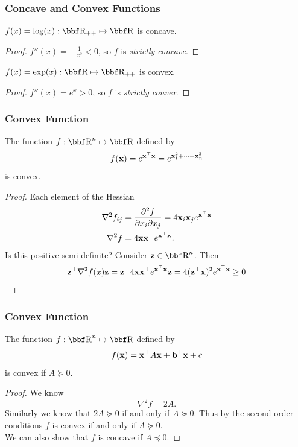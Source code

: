 \documentclass{beamer}
\begin{document}
\begin{frame}
    \frametitle{Concave and Convex Functions}
    \begin{example}
        $f(x) = \log(x) : \RR_{++} \mapsto \RR$ is concave.
    \end{example}
    \begin{proof}
        $f''(x) = -\frac{1}{x^2} < 0$, so $f$ is \textit{strictly concave}.
    \end{proof}
    \begin{example}
        $f(x) = \exp(x) : \RR \mapsto \RR_{++}$ is convex.
    \end{example}
    \begin{proof}
        $f''(x) = e^x > 0$, so $f$ is \textit{strictly convex}.
    \end{proof}
\end{frame}

\begin{frame}
    \frametitle{Convex Function}
    \begin{example}
        The function $f : \RR^n \mapsto \RR$ defined by
        \[
            f({\bf x}) = e^{{\bf x}^\top{\bf x}} = e^{{\bf x}_1^2 + \dots + {\bf x}_n^2}
        \]
        is convex.
    \end{example}
    \begin{proof}
        Each element of the Hessian
        \begin{align*}
            \nabla^2f_{ij} &= \frac{\partial^2 f}{\partial x_i \partial x_j} = 4{\bf x}_i{\bf x}_j e^{{\bf x}^\top{\bf x}}\\
            \nabla^2f &= 4{\bf x}{\bf x}^\top e^{{\bf x}^\top{\bf x}}.
        \end{align*}
        Is this positive semi-definite? Consider $\zz\in\RR^n$. Then
        \[
            {\bf z}^\top\nabla^2 f(x){\bf z} = {\bf z}^\top4{\bf x}{\bf x}^\top e^{{\bf x}^\top{\bf x}} {\bf z} = 4({\bf z}^\top{\bf x})^2 e^{{\bf x}^\top{\bf x}} \geq 0
        \]
    \end{proof}
\end{frame}

\begin{frame}
    \frametitle{Convex Function}
    \begin{example}
        The function $f : \RR^n \mapsto \RR$ defined by
        \[
            f({\bf x}) = {\bf x}^\top A{\bf x} + {\bf b}^\top{\bf x} + c
        \]
        is convex if $A \succeq 0$.
    \end{example}
    \begin{proof}
        We know
        \[
            \nabla^2 f = 2A.
        \]
        Similarly we know that $2A \succeq 0$ if and only if
        $A \succeq 0$. Thus by the second order conditions $f$
        is convex if and only if $A \succeq 0$.\\

        We can also show that $f$ is concave if $A\preceq 0$.
    \end{proof}
\end{frame}
\end{document}
